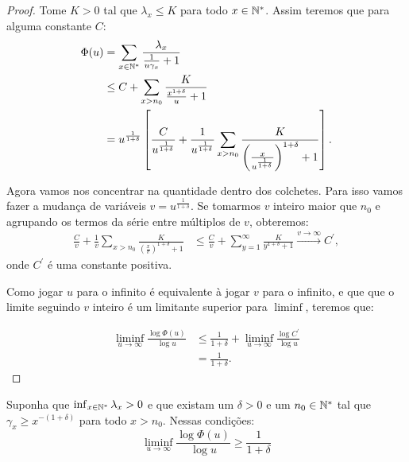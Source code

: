 \begin{proof}
  Tome $K > 0$ tal que $\lambda_x \leq K$ para todo $x \in {\mathbb{N^*}}$. Assim
  teremos que para alguma constante $C$:
  \begin{align*}
    \Phi(u) &= \sum_{x \in {\mathbb{N^*}}} \frac{\lambda_x}{\frac{1}{u\gamma_x} +
      1}\\
    &\leq C + \sum_{x > n_0} \frac{K}{\frac{x^{1+\delta}}{u} + 1}\\
    &=u^{\frac{1}{1+\delta}} \left[
      \frac{C}{u^{\frac{1}{1+\delta}}} +
      \frac{1}{u^{\frac{1}{1+\delta}}} \sum_{x > n_0} \frac{K}{
        \left( \frac{x}{u^{\frac{1}{1+\delta}}}  \right)^{1+\delta}
        + 1
      }
    \right].
  \end{align*}

  Agora vamos nos concentrar na quantidade dentro dos colchetes. Para
  isso vamos fazer a mudança de variáveis $v =
  u^{\frac{1}{1+\delta}}$. Se tomarmos $v$ inteiro maior que $n_0$ e
  agrupando os termos da série entre múltiplos de $v$, obteremos:
  \begin{align*}
    \frac{C}{v} + \frac{1}{v} \sum_{x > n_0} \frac{K}{ \left(
        \frac{x}{v} \right)^{1+\delta} + 1 }
    &\leq
    \frac{C}{v} + \sum_{y=1}^{\infty} \frac{K}{y^{1+\delta} + 1}
    \xrightarrow{v \to \infty} C^\prime,
  \end{align*}
  onde $C^\prime$ é uma constante positiva.

  Como jogar $u$ para o infinito é equivalente à jogar $v$ para o
  infinito, e que que o limite seguindo $v$ inteiro é um limitante
  superior para $\liminf$, teremos que:

  \begin{align*}
    \liminf_{u \to \infty} \frac{\log \Phi(u)}{\log u} &\leq
    \frac{1}{1+\delta} + \liminf_{u \to \infty} 
    \frac{\log{C^\prime}}{\log u}\\
    &= \frac{1}{1+\delta}.
  \end{align*}
\end{proof}

\begin{proposicao}
\label{prop:dominar-dim-haus-inf}
  Suponha que $\inf_{x\in{\mathbb{N^*}}}\lambda_x  > 0$ e que existam um
  $\delta>0$ e um $n_0 \in {\mathbb{N^*}}$ tal que $\gamma_x \geq x^{-(1+\delta)}$
  para todo $x > n_0$. Nessas condições:
  \begin{equation}
    \liminf_{u \to \infty} \frac{\log \Phi(u)}{\log u}  \geq \frac{1}{1+\delta}
  \end{equation}
\end{proposicao}

